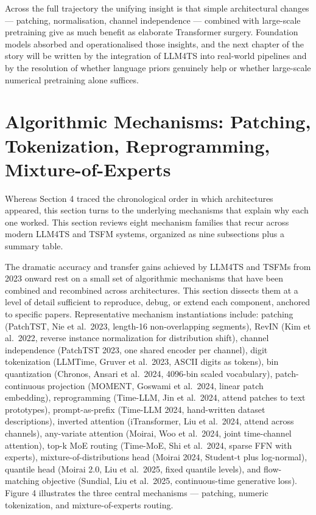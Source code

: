 \documentclass{article}
\begin{document}
Across the full trajectory the unifying insight is that simple architectural changes --- patching, normalisation, channel independence --- combined with large-scale pretraining give as much benefit as elaborate Transformer surgery. Foundation models absorbed and operationalised those insights, and the next chapter of the story will be written by the integration of LLM4TS into real-world pipelines and by the resolution of whether language priors genuinely help or whether large-scale numerical pretraining alone suffices.

\section{Algorithmic Mechanisms: Patching, Tokenization, Reprogramming, Mixture-of-Experts}\label{algorithmic-mechanisms-patching-tokenization-reprogramming-mixture-of-experts}

Whereas Section 4 traced the chronological order in which architectures appeared, this section turns to the underlying mechanisms that explain why each one worked. This section reviews eight mechanism families that recur across modern LLM4TS and TSFM systems, organized as nine subsections plus a summary table.

The dramatic accuracy and transfer gains achieved by LLM4TS and TSFMs from 2023 onward rest on a small set of algorithmic mechanisms that have been combined and recombined across architectures. This section dissects them at a level of detail sufficient to reproduce, debug, or extend each component, anchored to specific papers. Representative mechanism instantiations include: patching (PatchTST, Nie et al.~2023, length-16 non-overlapping segments), RevIN (Kim et al.~2022, reverse instance normalization for distribution shift), channel independence (PatchTST 2023, one shared encoder per channel), digit tokenization (LLMTime, Gruver et al.~2023, ASCII digits as tokens), bin quantization (Chronos, Ansari et al.~2024, 4096-bin scaled vocabulary), patch-continuous projection (MOMENT, Goswami et al.~2024, linear patch embedding), reprogramming (Time-LLM, Jin et al.~2024, attend patches to text prototypes), prompt-as-prefix (Time-LLM 2024, hand-written dataset descriptions), inverted attention (iTransformer, Liu et al.~2024, attend across channels), any-variate attention (Moirai, Woo et al.~2024, joint time-channel attention), top-k MoE routing (Time-MoE, Shi et al.~2024, sparse FFN with experts), mixture-of-distributions head (Moirai 2024, Student-t plus log-normal), quantile head (Moirai 2.0, Liu et al.~2025, fixed quantile levels), and flow-matching objective (Sundial, Liu et al.~2025, continuous-time generative loss). Figure 4 illustrates the three central mechanisms --- patching, numeric tokenization, and mixture-of-experts routing.
\end{document}

